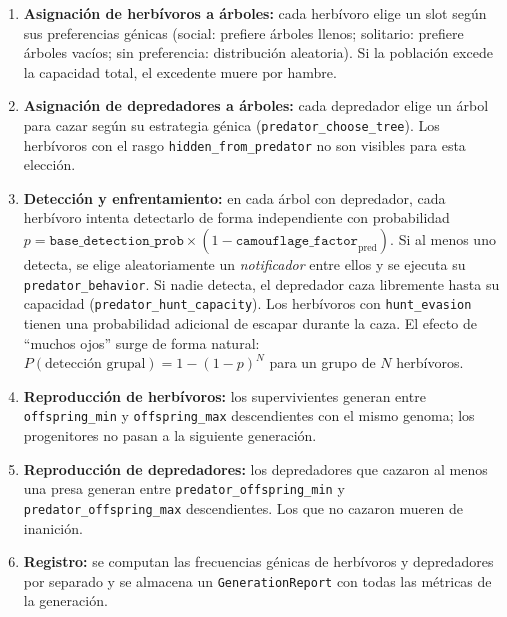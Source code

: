 \documentclass[11pt,a4paper]{article}
\begin{document}
\begin{enumerate}
    \item \textbf{Asignaci\'on de herb\'ivoros a \'arboles:} cada herb\'ivoro elige un slot seg\'un
    sus preferencias g\'enicas (social: prefiere \'arboles llenos; solitario: prefiere \'arboles vac\'ios;
    sin preferencia: distribuci\'on aleatoria). Si la poblaci\'on excede la capacidad total, el excedente
    muere por hambre.

    \item \textbf{Asignaci\'on de depredadores a \'arboles:} cada depredador elige un \'arbol para cazar
    seg\'un su estrategia g\'enica (\texttt{predator\_choose\_tree}). Los herb\'ivoros con el rasgo
    \texttt{hidden\_from\_predator} no son visibles para esta elecci\'on.

    \item \textbf{Detecci\'on y enfrentamiento:} en cada \'arbol con depredador, cada herb\'ivoro intenta
    detectarlo de forma independiente con probabilidad
    $p = \texttt{base\_detection\_prob} \times (1 - \texttt{camouflage\_factor}_\text{pred})$.
    Si al menos uno detecta, se elige aleatoriamente un \textit{notificador} entre ellos y se ejecuta
    su \texttt{predator\_behavior}. Si nadie detecta, el depredador caza libremente hasta su capacidad
    (\texttt{predator\_hunt\_capacity}). Los herb\'ivoros con \texttt{hunt\_evasion} tienen una probabilidad
    adicional de escapar durante la caza. El efecto de ``muchos ojos'' surge de forma natural:
    $P(\text{detecci\'on grupal}) = 1-(1-p)^{N}$ para un grupo de $N$ herb\'ivoros.

    \item \textbf{Reproducci\'on de herb\'ivoros:} los supervivientes generan entre
    \texttt{offspring\_min} y \texttt{offspring\_max} descendientes con el mismo genoma;
    los progenitores no pasan a la siguiente generaci\'on.

    \item \textbf{Reproducci\'on de depredadores:} los depredadores que cazaron al menos una presa
    generan entre \texttt{predator\_offspring\_min} y \texttt{predator\_offspring\_max} descendientes.
    Los que no cazaron mueren de inanici\'on.

    \item \textbf{Registro:} se computan las frecuencias g\'enicas de herb\'ivoros y depredadores por separado
    y se almacena un \texttt{GenerationReport} con todas las m\'etricas de la generaci\'on.
\end{enumerate}
\end{document}
